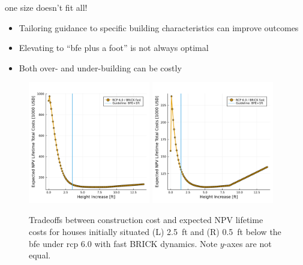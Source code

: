 \begin{block}{one size doesn't fit all!}
    \begin{itemize}
        \item Tailoring guidance to specific building characteristics can improve outcomes
        \item Elevating to ``\gls{bfe} plus a foot'' is not always optimal \cite{xian_elevation:2017,zarekarizi_suboptimal:2020}
        \item Both over- and under-building can be costly \cite{ansar_bigisfragile:2017,DossGollin:2019}
    \end{itemize}
    \begin{framed}
        \begin{figure}
            \centering
            \includegraphics[width=0.475\textwidth]{5.5.pdf}%
            \includegraphics[width=0.475\textwidth]{7.5.pdf}
            \caption{
                Tradeoffs between construction cost and expected NPV lifetime costs for houses initially situated (L) \SI{2.5}{ft} and (R) \SI{0.5}{ft} below the \gls{bfe} under \gls{rcp} 6.0 with fast BRICK \cite{wong_brick0.2:2017} dynamics.
                Note $y$-axes are not equal.
            }
        \end{figure}
    \end{framed}
\end{block}